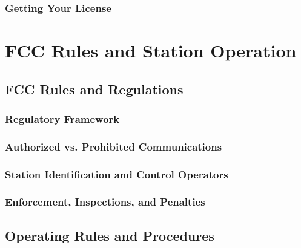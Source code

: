 \documentclass[12pt]{book}
\begin{document}
\section{Getting Your License}




\part{FCC Rules and Station Operation}
\chapter{FCC Rules and Regulations}
\section{Regulatory Framework}

\section{Authorized vs. Prohibited Communications}






\section{Station Identification and Control Operators}


\section{Enforcement, Inspections, and Penalties}


\chapter{Operating Rules and Procedures}
\end{document}
